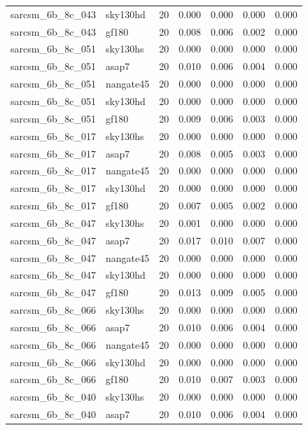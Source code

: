 \begin{tabular}{llrrrrr}
sarcsm\_6b\_8c\_043 & sky130hd & 20 & 0.000 & 0.000 & 0.000 & 0.000 \\
sarcsm\_6b\_8c\_043 & gf180 & 20 & 0.008 & 0.006 & 0.002 & 0.000 \\
sarcsm\_6b\_8c\_051 & sky130hs & 20 & 0.000 & 0.000 & 0.000 & 0.000 \\
sarcsm\_6b\_8c\_051 & asap7 & 20 & 0.010 & 0.006 & 0.004 & 0.000 \\
sarcsm\_6b\_8c\_051 & nangate45 & 20 & 0.000 & 0.000 & 0.000 & 0.000 \\
sarcsm\_6b\_8c\_051 & sky130hd & 20 & 0.000 & 0.000 & 0.000 & 0.000 \\
sarcsm\_6b\_8c\_051 & gf180 & 20 & 0.009 & 0.006 & 0.003 & 0.000 \\
sarcsm\_6b\_8c\_017 & sky130hs & 20 & 0.000 & 0.000 & 0.000 & 0.000 \\
sarcsm\_6b\_8c\_017 & asap7 & 20 & 0.008 & 0.005 & 0.003 & 0.000 \\
sarcsm\_6b\_8c\_017 & nangate45 & 20 & 0.000 & 0.000 & 0.000 & 0.000 \\
sarcsm\_6b\_8c\_017 & sky130hd & 20 & 0.000 & 0.000 & 0.000 & 0.000 \\
sarcsm\_6b\_8c\_017 & gf180 & 20 & 0.007 & 0.005 & 0.002 & 0.000 \\
sarcsm\_6b\_8c\_047 & sky130hs & 20 & 0.001 & 0.000 & 0.000 & 0.000 \\
sarcsm\_6b\_8c\_047 & asap7 & 20 & 0.017 & 0.010 & 0.007 & 0.000 \\
sarcsm\_6b\_8c\_047 & nangate45 & 20 & 0.000 & 0.000 & 0.000 & 0.000 \\
sarcsm\_6b\_8c\_047 & sky130hd & 20 & 0.000 & 0.000 & 0.000 & 0.000 \\
sarcsm\_6b\_8c\_047 & gf180 & 20 & 0.013 & 0.009 & 0.005 & 0.000 \\
sarcsm\_6b\_8c\_066 & sky130hs & 20 & 0.000 & 0.000 & 0.000 & 0.000 \\
sarcsm\_6b\_8c\_066 & asap7 & 20 & 0.010 & 0.006 & 0.004 & 0.000 \\
sarcsm\_6b\_8c\_066 & nangate45 & 20 & 0.000 & 0.000 & 0.000 & 0.000 \\
sarcsm\_6b\_8c\_066 & sky130hd & 20 & 0.000 & 0.000 & 0.000 & 0.000 \\
sarcsm\_6b\_8c\_066 & gf180 & 20 & 0.010 & 0.007 & 0.003 & 0.000 \\
sarcsm\_6b\_8c\_040 & sky130hs & 20 & 0.000 & 0.000 & 0.000 & 0.000 \\
sarcsm\_6b\_8c\_040 & asap7 & 20 & 0.010 & 0.006 & 0.004 & 0.000 \\

\end{tabular}

